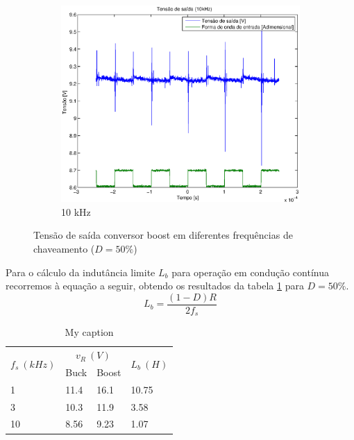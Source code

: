\documentclass{article}
\begin{document}
\begin{figure}[H]
\begin{subfigure}[b]{0.3\textwidth}
		\includegraphics[width=\textwidth]{Dados/boost/t10k}
		\caption{10 kHz}
	\end{subfigure}
	\caption{Tensão de saída conversor boost em diferentes frequências de chaveamento ($D=50\%$)}
	\label{fig:bot}
\end{figure}

Para o cálculo da indutância limite $L_b$ para operação em condução contínua recorremos à equação a seguir, obtendo os resultados da tabela \ref{tab:Lb} para $D=50\%$.
\begin{equation}
L_b = \frac{(1-D)R}{2f_s}	
\end{equation}

\begin{table}[]
	\centering
	\caption{My caption}
	\label{tab:Lb}
	\begin{tabular}{|l|l|l|l|}
		\hline
		\multicolumn{1}{|c|}{\multirow{2}{*}{$f_s\ (kHz)$}} & 
		\multicolumn{2}{c|}{$v_R\ (V)$} & 
		\multicolumn{1}{c|}{\multirow{2}{*}{$L_b\ (H)$}} \\ \cline{2-3}
		\multicolumn{1}{|c|}{} 	& Buck           & Boost          & 
		\multicolumn{1}{c|}{}                          					  \\ \hline
		1     					& 11.4           & 16.1           & 10.75 \\ \hline
		3     					& 10.3           & 11.9           & 3.58  \\ \hline
		10    					& 8.56           & 9.23           & 1.07  \\ \hline
	\end{tabular}
\end{table}	
\end{document}
